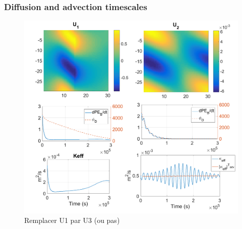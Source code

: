 \subsubsection{Diffusion and advection timescales}
\begin{figure}[h!]
\centering
\includegraphics[width=1\textwidth]{./CHAP_BPE/Fig_numlab_advdiff2.png}
\caption{\color{red}Remplacer U1 par U3 (ou pas)\color{black}}
\label{fig4numlab}
\end{figure}
